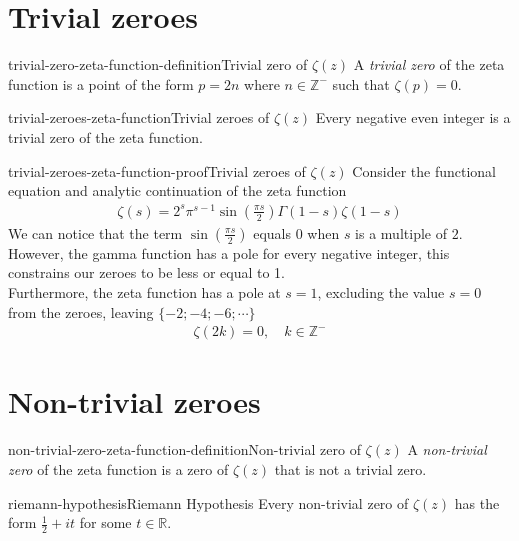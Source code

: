 \documentclass[preview]{standalone}
\begin{document}
\genpage

\section{Trivial zeroes}

\begin{snippetdefinition}{trivial-zero-zeta-function-definition}{Trivial zero of \(\zeta(z)\)}
    A \textit{trivial zero} of the zeta function is a point of the form \(p = 2n\)
    where \(n \in \mathbb{Z}^-\) such that \(\zeta(p)=0\).
\end{snippetdefinition}

\begin{snippetproposition}{trivial-zeroes-zeta-function}{Trivial zeroes of \(\zeta(z)\)}
    Every negative even integer is a trivial zero of the zeta function.
\end{snippetproposition}

\begin{snippetproof}{trivial-zeroes-zeta-function-proof}{Trivial zeroes of \(\zeta(z)\)}
    Consider the functional equation and analytic continuation of the zeta function
    \begin{align*}
        \zeta(s)=2^s\pi^{s-1}\sin\left(\frac{\pi s}{2}\right)\Gamma(1-s)\zeta(1-s)
    \end{align*}
    We can notice that the term \(\sin\left(\frac{\pi s}{2}\right)\) equals \(0\) when \(s\) is a multiple of \(2\).
    \\
    However, the gamma function has a pole for every negative integer, this constrains our zeroes to be less or equal to 1.\\
    Furthermore, the zeta function has a pole at \(s=1\), excluding the value \(s=0\) from the zeroes, leaving \(\{-2;-4;-6;\cdots\}\)
    \begin{align*}
        \zeta(2k)=0,
        \quad k\in \mathbb{Z}^{-}
    \end{align*}
\end{snippetproof}

\section{Non-trivial zeroes}

\begin{snippetdefinition}{non-trivial-zero-zeta-function-definition}{Non-trivial zero of \(\zeta(z)\)}
    A \textit{non-trivial zero} of the zeta function is a zero of \(\zeta(z)\)
    that is not a trivial zero.
\end{snippetdefinition}

\begin{snippetproposition}{riemann-hypothesis}{Riemann Hypothesis}
    Every non-trivial zero of \(\zeta(z)\) has the form \(\frac{1}{2} + it\)
    for some \(t \in \mathbb{R}\).
\end{snippetproposition}

\end{document}
